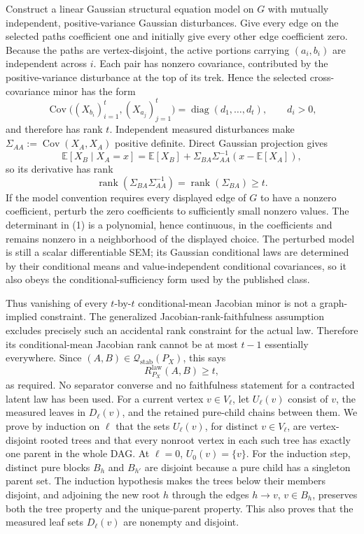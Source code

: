 Construct a linear Gaussian structural equation model on \(G\) with mutually independent, positive-variance Gaussian disturbances.  Give every edge on the selected paths coefficient one and initially give every other edge coefficient zero.  Because the paths are vertex-disjoint, the active portions carrying \((a_i,b_i)\) are independent across \(i\).  Each pair has nonzero covariance, contributed by the positive-variance disturbance at the top of its trek.  Hence the selected cross-covariance minor has the form
\[
 \operatorname{Cov}\bigl((X_{b_i})_{i=1}^t,(X_{a_j})_{j=1}^t\bigr)
 =\operatorname{diag}(d_1,\ldots,d_t),
 \qquad d_i>0, \tag{1}
\]
and therefore has rank \(t\).  Independent measured disturbances make \(\Sigma_{AA}:=\operatorname{Cov}(X_A,X_A)\) positive definite.  Direct Gaussian projection gives
\[
 \mathbb E[X_B\mid X_A=x]
 =\mathbb E[X_B]+\Sigma_{BA}\Sigma_{AA}^{-1}(x-\mathbb E[X_A]), \tag{2}
\]
so its derivative has rank
\[
 \operatorname{rank}(\Sigma_{BA}\Sigma_{AA}^{-1})
 =\operatorname{rank}(\Sigma_{BA})\geq t. \tag{3}
\]
If the model convention requires every displayed edge of \(G\) to have a nonzero coefficient, perturb the zero coefficients to sufficiently small nonzero values.  The determinant in (1) is a polynomial, hence continuous, in the coefficients and remains nonzero in a neighborhood of the displayed choice.  The perturbed model is still a scalar differentiable SEM; its Gaussian conditional laws are determined by their conditional means and value-independent conditional covariances, so it also obeys the conditional-sufficiency form used by the published class.

Thus vanishing of every \(t\)-by-\(t\) conditional-mean Jacobian minor is not a graph-implied constraint.  The generalized Jacobian-rank-faithfulness assumption excludes precisely such an accidental rank constraint for the actual law.  Therefore its conditional-mean Jacobian rank cannot be at most \(t-1\) essentially everywhere.  Since \((A,B)\in\mathcal Q_{\mathrm{stab}}(P_X)\), this says
\[
 R^{\mathrm{law}}_{P_X}(A,B)\geq t,
\]
as required.  No separator converse and no faithfulness statement for a contracted latent law has been used.
For a current vertex \(v\in V_\ell\), let \(U_\ell(v)\) consist of \(v\), the measured leaves in \(D_\ell(v)\), and the retained pure-child chains between them.  We prove by induction on \(\ell\) that the sets \(U_\ell(v)\), for distinct \(v\in V_\ell\), are vertex-disjoint rooted trees and that every nonroot vertex in each such tree has exactly one parent in the whole DAG.  At \(\ell=0\), \(U_0(v)=\{v\}\).  For the induction step, distinct pure blocks \(B_h\) and \(B_{h'}\) are disjoint because a pure child has a singleton parent set.  The induction hypothesis makes the trees below their members disjoint, and adjoining the new root \(h\) through the edges \(h\to v\), \(v\in B_h\), preserves both the tree property and the unique-parent property.  This also proves that the measured leaf sets \(D_\ell(v)\) are nonempty and disjoint.

